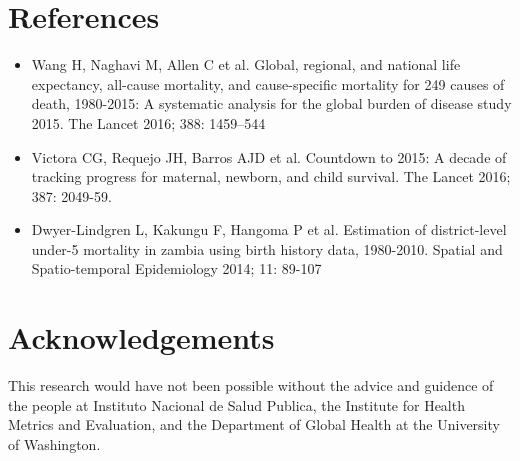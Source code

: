 \documentclass[a0,portrait]{a0poster}
\begin{document}
\begin{multicols}{2}
\section*{References}
\begin{itemize}
\item Wang H, Naghavi M, Allen C et al. Global, regional, and national life expectancy, all-cause mortality, and cause-specific mortality for 249 causes of death, 1980-2015: A systematic analysis for the global burden of disease study 2015. The Lancet 2016; 388: 1459–544
\item Victora CG, Requejo JH, Barros AJD et al. Countdown to 2015: A decade of tracking progress for maternal, newborn, and child survival. The Lancet 2016; 387: 2049-59.
\item Dwyer-Lindgren L, Kakungu F, Hangoma P et al. Estimation of district-level under-5 mortality in zambia using birth history data, 1980-2010. Spatial and Spatio-temporal Epidemiology 2014; 11: 89-107
\end{itemize}


\section*{Acknowledgements}

This research would have not been possible without the advice and guidence of the people at Instituto Nacional de Salud Publica, the Institute for Health Metrics and Evaluation, and the Department of Global Health at the University of Washington.


\end{multicols}
\end{document}

